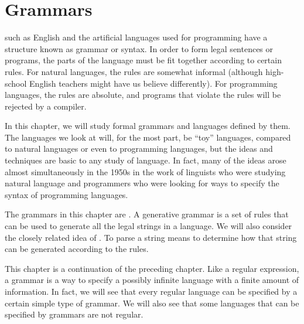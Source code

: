 
\chapter{Grammars}\label{C-grammars}


such as English and the
artificial languages used for programming have a structure
known as grammar or syntax.  In order to form legal sentences
or programs, the parts of the language must be fit together
according to certain rules.  For natural languages, the
rules are somewhat informal (although high-school English
teachers might have us believe differently).  For programming
languages, the rules are absolute, and programs that violate
the rules will be rejected by a compiler.

In this chapter, we will study formal grammars and languages
defined by them.  The languages we look at will, for the most part,
be ``toy'' languages, compared to natural languages or even
to programming languages, but the ideas and techniques are basic
to any study of language.  In fact, many of the ideas arose
almost simultaneously in the 1950s in the work of linguists who were
studying natural language and programmers who were looking for
ways to specify the syntax of programming languages.

The grammars in this chapter are .
A generative grammar is a set of rules that can be used to generate
all the legal strings in a language.  We will also consider the closely
related idea of .  To parse a string means to determine
how that string can be generated according to the rules.

This chapter is a continuation of the preceding chapter.  
Like a regular expression, a grammar is a way to specify a possibly
infinite language with a finite amount of information.  In fact,
we will see that every regular language can be specified
by a certain simple type of grammar.  We will also see that some languages
that can be specified by grammars are not regular.

\endinput

